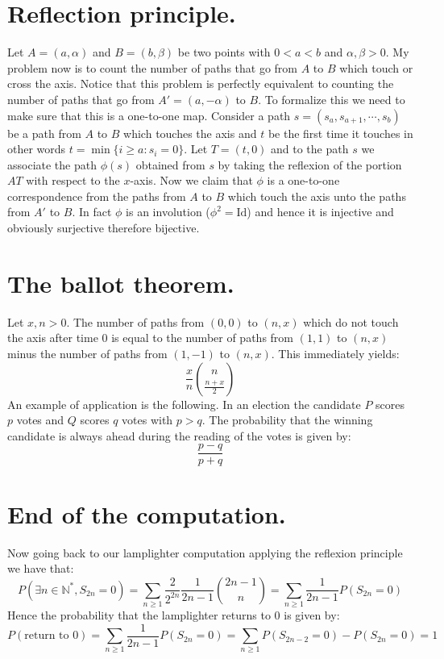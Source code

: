 \documentclass[10pt,a4paper]{book}
\theoremstyle{definition}
\begin{document}
\section{Reflection principle.} Let $A = (a, \alpha)$ and $B = (b, \beta)$ be two points with $0 < a < b$ and $\alpha, \beta > 0$. My problem now is to count the number of paths that go from $A$ to $B$ which touch or cross the axis. Notice that this problem is perfectly equivalent to counting the number of paths that go from $A' = (a, -\alpha)$ to $B$. To formalize this we need to make sure that this is a one-to-one map. Consider a path $s = (s_a, s_{a+1}, \cdots, s_b)$ be a path from $A$ to $B$ which touches the axis and $t$ be the first time it touches in other words $t = \min\{ i \geq a : s_i = 0\}$. Let $T = (t, 0)$ and to the path $s$ we associate the path $\phi(s)$ obtained from $s$ by taking the reflexion of the portion $AT$ with respect to the $x$-axis. Now we claim that $\phi$ is a one-to-one correspondence from the paths from $A$ to $B$ which touch the axis unto the paths from $A'$ to $B$. In fact $\phi$ is an involution ($\phi^2 = \text{Id}$) and hence it is injective and obviously surjective therefore bijective. 

\section{The ballot theorem.} Let $x, n > 0$. The number of paths from $(0,0)$ to $(n, x)$ which do not touch the axis after time $0$ is equal to the number of paths from $(1, 1)$ to $(n,x)$ minus the number of paths from $(1, -1)$ to $(n, x)$. This immediately yields:
\[
\frac{x}{n}\binom{n}{\frac{n+x}{2}}
\]  
An example of application is the following. In an election the candidate $P$ scores $p$ votes and $Q$ scores $q$ votes with $p > q$. The probability that the winning candidate is always ahead during the reading of the votes is given by:
\[
\frac{p - q}{p + q}
\]

\section{End of the computation.}
Now going back to our lamplighter computation applying the reflexion principle we have that:
\[
P(\exists n \in \mathbb{N}^*, S_{2n} = 0) = \sum_{n \geq 1} \frac{2}{2^{2n}} \frac{1}{2n - 1} \binom{2n - 1}{n} = \sum_{n \geq 1} \frac{1}{2n - 1} P(S_{2n} = 0)
\]
Hence the probability that the lamplighter returns to 0 is given by:
\[
P(\text{return to 0}) = \sum_{n \geq 1} \frac{1}{2n -1} P(S_{2n} = 0) = \sum_{n \geq 1} P(S_{2n - 2} = 0 ) - P(S_{2n} = 0) = 1
\]
\end{document}
